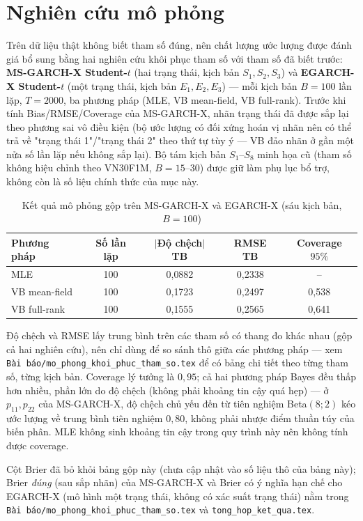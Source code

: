 \documentclass[11pt,a4paper]{article}
\begin{document}
\section{Nghiên cứu mô phỏng}
\label{sec:nghien-cuu-mo-phong}

Trên dữ liệu thật không biết tham số đúng, nên chất lượng ước lượng được đánh
giá bổ sung bằng hai nghiên cứu khôi phục tham số với tham số đã biết trước:
\textbf{MS-GARCH-X Student-$t$} (hai trạng thái, kịch bản $S_1,S_2,S_3$)
và \textbf{EGARCH-X Student-$t$} (một trạng thái, kịch bản $E_1,E_2,E_3$)
--- mỗi kịch bản $B=100$ lần lặp, $T=2000$, ba phương pháp (MLE, VB mean-field,
VB full-rank). Trước khi tính Bias/RMSE/Coverage của MS-GARCH-X, nhãn trạng thái đã
được sắp lại theo phương sai vô điều kiện (bộ ước lượng có đối xứng hoán vị
nhãn nên có thể trả về "trạng thái 1"/"trạng thái 2" theo thứ tự tùy ý --- VB
đảo nhãn ở gần một nửa số lần lặp nếu không sắp lại). Bộ tám kịch bản $S_1$--$S_8$
minh họa cũ (tham số không hiệu chỉnh theo VN30F1M, $B=15$--$30$) được giữ làm
phụ lục bổ trợ, không còn là số liệu chính thức của mục này.

\begin{table}[H]\centering
\caption{Kết quả mô phỏng gộp trên MS-GARCH-X và EGARCH-X (sáu kịch bản, $B=100$)}
\begin{threeparttable}
\begin{tabularx}{\textwidth}{l C C C C}
\toprule
\textbf{Phương pháp} & \textbf{Số lần lặp} & \textbf{$|$Độ chệch$|$ TB} & \textbf{RMSE TB} & \textbf{Coverage $95\%$} \\
\midrule
MLE & 100 & 0{,}0882 & 0{,}2338 & -- \\
VB mean-field & 100 & 0{,}1723 & 0{,}2497 & 0{,}538 \\
VB full-rank & 100 & 0{,}1555 & 0{,}2565 & 0{,}641 \\
\bottomrule
\end{tabularx}
\begin{tablenotes}\small
\item Độ chệch và RMSE lấy trung bình trên các tham số có thang đo khác nhau (gộp cả hai nghiên cứu), nên chỉ dùng để so sánh thô giữa các phương pháp --- xem \texttt{Bài báo/mo\_phong\_khoi\_phuc\_tham\_so.tex} để có bảng chi tiết theo từng tham số, từng kịch bản. Coverage lý tưởng là $0{,}95$; cả hai phương pháp Bayes đều thấp hơn nhiều, phần lớn do độ chệch (không phải khoảng tin cậy quá hẹp) --- ở $p_{11},p_{22}$ của MS-GARCH-X, độ chệch chủ yếu đến từ tiên nghiệm Beta$(8;2)$ kéo ước lượng về trung bình tiên nghiệm $0{,}80$, không phải nhược điểm thuần túy của biến phân. MLE không sinh khoảng tin cậy trong quy trình này nên không tính được coverage.
\item Cột Brier đã bỏ khỏi bảng gộp này (chưa cập nhật vào số liệu thô của bảng này); Brier \emph{đúng} (sau sắp nhãn) của MS-GARCH-X và Brier có ý nghĩa hạn chế cho EGARCH-X (mô hình một trạng thái, không có xác suất trạng thái) nằm trong \texttt{Bài báo/mo\_phong\_khoi\_phuc\_tham\_so.tex} và \texttt{tong\_hop\_ket\_qua.tex}.
\end{tablenotes}
\end{threeparttable}
\end{table}
\end{document}
